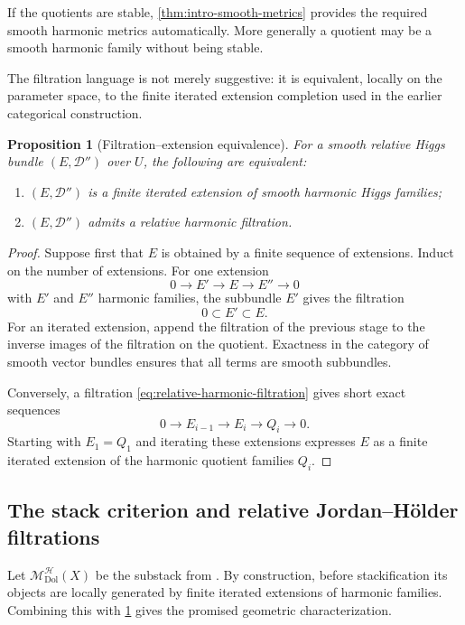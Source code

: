 \documentclass[11pt,reqno]{amsart}
\newtheorem{proposition}[theorem]{Proposition}
\theoremstyle{definition}
\theoremstyle{remark}
\newcommand{\cD}{\mathcal D}
\newcommand{\cH}{\mathcal H}
\newcommand{\Dol}{\mathrm{Dol}}
\newcommand{\MHDol}{\mathscr M^{\cH}_{\Dol}}
\begin{document}
If the quotients are stable, \cref{thm:intro-smooth-metrics} provides the required smooth harmonic metrics automatically.  More generally a quotient may be a smooth harmonic family without being stable.


The filtration language is not merely suggestive: it is equivalent, locally on the parameter space, to the finite iterated extension completion used in the earlier categorical construction.


\begin{proposition}[Filtration--extension equivalence]\label{prop:filtration-extension}
For a smooth relative Higgs bundle $(E,\cD'')$ over $U$, the following are equivalent:
\begin{enumerate}[label=(\roman*)]
\item $(E,\cD'')$ is a finite iterated extension of smooth harmonic Higgs families;
\item $(E,\cD'')$ admits a relative harmonic filtration.
\end{enumerate}
\end{proposition}

\begin{proof}
Suppose first that $E$ is obtained by a finite sequence of extensions.  Induct on the number of extensions.  For one extension
\[
  0\to E'\to E\to E''\to0
\]
with $E'$ and $E''$ harmonic families, the subbundle $E'$ gives the filtration
\[
  0\subset E'\subset E.
\]
For an iterated extension, append the filtration of the previous stage to the inverse images of the filtration on the quotient.  Exactness in the category of smooth vector bundles ensures that all terms are smooth subbundles.

Conversely, a filtration \eqref{eq:relative-harmonic-filtration} gives short exact sequences
\[
  0\to E_{i-1}\to E_i\to Q_i\to0.
\]
Starting with $E_1=Q_1$ and iterating these extensions expresses $E$ as a finite iterated extension of the harmonic quotient families $Q_i$.
\end{proof}

\subsection{The stack criterion and relative Jordan--H\"older filtrations}

Let $\MHDol(X)$ be the substack from \cite{AzamRayan2026}.  By construction, before stackification its objects are locally generated by finite iterated extensions of harmonic families.  Combining this with \cref{prop:filtration-extension} gives the promised geometric characterization.
\end{document}
